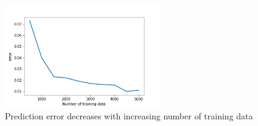 \documentclass{article}
\begin{document}


\begin{figure}
    \center
    \includegraphics[width=0.6\textwidth]{figures/error.png}
    \caption{Prediction error decreases with increasing number of training data}
\end{figure}
\end{document}
